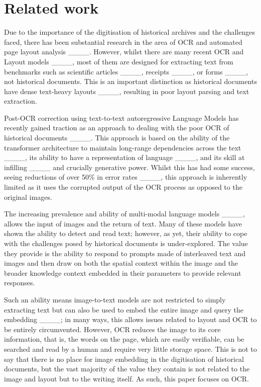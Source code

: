 \section{Related work}
Due to the importance of the digitisation of historical archives and the challenges faced, there has been substantial research in the area of OCR and automated page layout analysis ____. However, whilst there are many recent OCR and Layout models ____, most of them are designed for extracting text from benchmarks such as scientific articles ____, receipts ____, or forms ____, not historical documents. This is an important distinction as historical documents have dense text-heavy layouts ____, resulting in poor layout parsing and text extraction. 

Post-OCR correction using text-to-text autoregressive Language Models has recently gained traction as an approach to dealing with the poor OCR of historical documents ____. This approach is based on the ability of the transformer architecture to maintain long-range dependencies across the text ____, its ability to have a representation of language ____, and its skill at infilling ____ and crucially generative power. Whilst this has had some success, seeing reductions of over 50\% in error rates ____, this approach is inherently limited as it uses the corrupted output of the OCR process as opposed to the original images. 

The increasing prevalence and ability of multi-modal language models ____, allows the input of images and the return of text. Many of these models have shown the ability to detect and read text; however, as yet, their ability to cope with the challenges posed by historical documents is under-explored. The value they provide is the ability to respond to prompts made of interleaved text and images and then draw on both the spatial context within the image and the broader knowledge context embedded in their parameters to provide relevant responses. 

Such an ability means image-to-text models are not restricted to simply extracting text but can also be used to embed the entire image and query the embedding ____; in many ways, this allows issues related to layout and OCR to be entirely circumvented. However, OCR reduces the image to its core information, that is, the words on the page, which are easily verifiable, can be searched and read by a human and require very little storage space. This is not to say that there is no place for image embedding in the digitisation of historical documents, but the vast majority of the value they contain is not related to the image and layout but to the writing itself. As such, this paper focuses on OCR.

